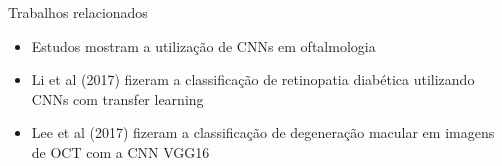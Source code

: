 \documentclass{beamer}
\begin{document}
\begin{frame}{Trabalhos relacionados}
    \begin{itemize}
        \item Estudos mostram a utilização de CNNs em oftalmologia
        \item Li et al (2017) fizeram a classificação de retinopatia diabética utilizando CNNs com transfer learning 
        \item Lee et al (2017) fizeram a classificação de degeneração macular em imagens de OCT com a CNN VGG16 
    \end{itemize}
    
\end{frame}
\end{document}

